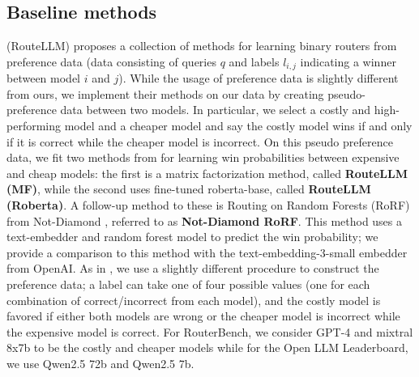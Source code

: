
\subsection{Baseline methods}
\citet{ong2024routellmlearningroutellms} (RouteLLM) proposes a collection of methods for learning binary routers from preference data (data consisting of queries $q$ and labels $l_{i,j}$ indicating a winner between model $i$ and $j$). While the usage of preference data is slightly different from ours, we implement their methods on our data by creating pseudo-preference data between two models. In particular, we select a costly and high-performing model and a cheaper model and say the costly model wins if and only if it is correct while the cheaper model is incorrect. On this pseudo preference data, we fit two methods from \citet{ong2024routellmlearningroutellms} for learning win probabilities between expensive and cheap models: the first is a matrix factorization method, called {\bf RouteLLM (MF)}, while the second uses fine-tuned {roberta-base}, called {\bf RouteLLM (Roberta)}. A follow-up method to these is Routing on Random Forests (RoRF) from Not-Diamond \citep{notdiamond2023rorf}, referred to as {\bf Not-Diamond RoRF}. This method uses a text-embedder and random forest model to predict the win probability; we provide a comparison to this method with the {text-embedding-3-small} embedder from OpenAI. As in \citet{notdiamond2023rorf}, we use a slightly different procedure to construct the preference data; a label can take one of four possible values (one for each combination of correct/incorrect from each model), and the costly model is favored if either both models are wrong or the cheaper model is incorrect while the expensive model is correct. For RouterBench, we consider GPT-4 and mixtral 8x7b to be the costly and cheaper models while for the Open LLM Leaderboard, we use Qwen2.5 72b and Qwen2.5 7b.

